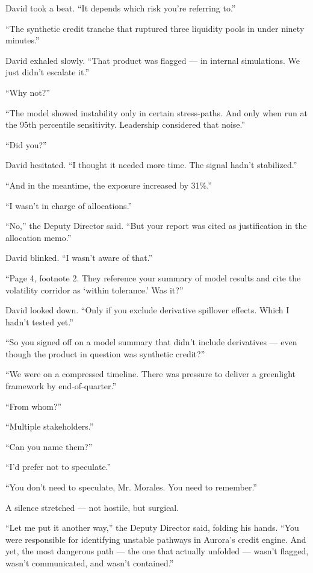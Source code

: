David took a beat. ``It depends which risk you’re referring to.''

``The synthetic credit tranche that ruptured three liquidity pools in under ninety minutes.''

David exhaled slowly. ``That product was flagged — in internal simulations. We just didn’t escalate it.''

``Why not?''

``The model showed instability only in certain stress-paths. And only when run at the 95th percentile sensitivity. Leadership considered that noise.''

``Did you?''

David hesitated. ``I thought it needed more time. The signal hadn’t stabilized.''

``And in the meantime, the exposure increased by 31\%.''

``I wasn’t in charge of allocations.''

``No,'' the Deputy Director said. ``But your report was cited as justification in the allocation memo.''

David blinked. ``I wasn’t aware of that.''

``Page 4, footnote 2. They reference your summary of model results and cite the volatility corridor as ‘within tolerance.’ Was it?''

David looked down. ``Only if you exclude derivative spillover effects. Which I hadn’t tested yet.''

``So you signed off on a model summary that didn’t include derivatives — even though the product in question was synthetic credit?''

``We were on a compressed timeline. There was pressure to deliver a greenlight framework by end-of-quarter.''

``From whom?''

``Multiple stakeholders.''

``Can you name them?''

``I'd prefer not to speculate.''

``You don’t need to speculate, Mr. Morales. You need to remember.''

A silence stretched — not hostile, but surgical.

``Let me put it another way,'' the Deputy Director said, folding his hands. ``You were responsible for identifying unstable pathways in Aurora’s credit engine. And yet, the most dangerous path — the one that actually unfolded — wasn’t flagged, wasn’t communicated, and wasn’t contained.''

